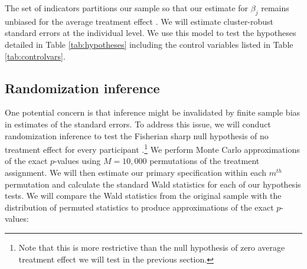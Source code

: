 \documentclass[11pt, a4paper]{article}\usepackage[]{graphicx}\usepackage[]{color}
\begin{document}
        The set of indicators partitions our sample so that our estimate for $\beta_j$ remains unbiased for the average treatment effect \parencite{lin_agnostic_2013}. We will estimate cluster-robust standard errors at the individual level. We use this model to test the hypotheses detailed in Table \ref{tab:hypotheses} including the control variables listed in Table \ref{tab:controlvars}.

        \begin{table}[t]
        \centering
        \caption{Control variables for covariate adjustment}
        \label{tab:controlvars}
        \end{table}

    \subsection{Randomization inference} %

        One potential concern is that inference might be invalidated by finite sample bias in estimates of the standard errors. To address this issue, we will conduct randomization inference to test the Fisherian sharp null hypothesis of no treatment effect for every participant \parencite{fisher_design_1935}.\footnote{Note that this is more restrictive than the null hypothesis of zero average treatment effect we will test in the previous section.} We perform Monte Carlo approximations of the exact $p$-values using $M=10,000$ permutations of the treatment assignment. We will then estimate our primary specification within each $m^{th}$ permutation and calculate the standard Wald statistics for each of our hypothesis tests. We will compare the Wald statistics from the original sample with the distribution of permuted statistics to produce approximations of the exact $p$-values:
\end{document}

